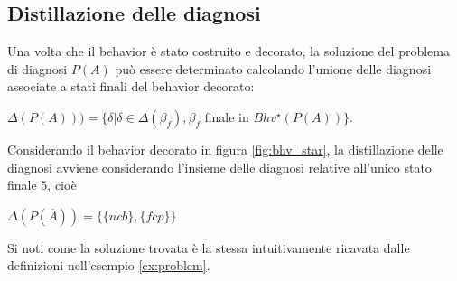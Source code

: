 \subsection{Distillazione delle diagnosi}
Una volta che il behavior è stato costruito e decorato, la soluzione del problema di diagnosi $P(A)$ può essere determinato calcolando l'unione delle diagnosi associate a stati finali del behavior decorato:
\begin{center}
$\Delta(P(A))) = \{\delta | \delta \in \Delta(\beta_f), \beta_f$ finale in $Bhv^\star(P(A))\}$.
\end{center}


\begin{ex}
Considerando il behavior decorato in figura \ref{fig:bhv_star}, la distillazione delle diagnosi avviene considerando l'insieme delle diagnosi relative all'unico stato finale $5$, cioè
\begin{center}
$\Delta(P(\overline{A})) = \{\{ncb\},\{fcp\}\}$
\end{center}
Si noti come la soluzione trovata è la stessa intuitivamente ricavata dalle definizioni nell'esempio \ref{ex:problem}.
\end{ex}